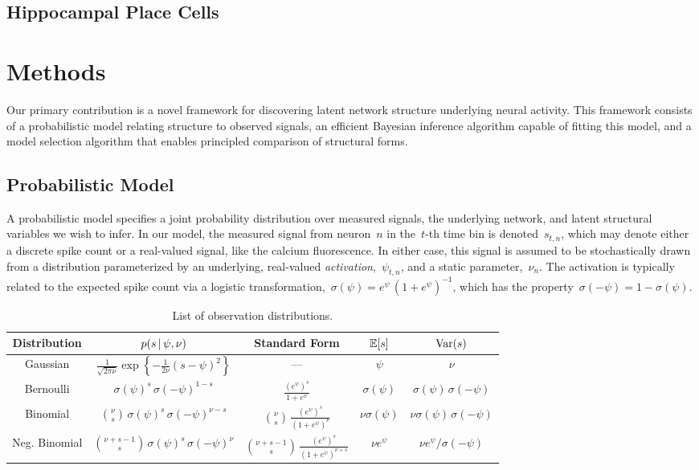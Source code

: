 \subsection{Hippocampal Place Cells}


\section{Methods}
Our primary contribution is a novel framework for discovering latent
network structure underlying neural activity.  This framework consists
of a probabilistic model relating structure to observed signals, an
efficient Bayesian inference algorithm capable of fitting this model,
and a model selection algorithm that enables principled comparison of
structural forms.

\subsection{Probabilistic Model}
A probabilistic model specifies a joint probability distribution over
measured signals, the underlying network, and latent structural
variables we wish to infer.  In our model, the measured signal from
neuron~$n$ in the~$t$-th time bin is denoted~$s_{t,n}$, which may 
denote either a discrete spike count or a real-valued signal, like 
the calcium fluorescence. In either case, this signal is assumed 
to be stochastically drawn from a distribution parameterized by 
an underlying, real-valued \emph{activation},~$\psi_{t,n}$,
and a static parameter,~$\nu_n$. The
activation is typically related to the expected spike count via
a logistic transformation,~$\sigma(\psi) = e^\psi \, (1+e^\psi)^{-1}$,
which has the property~$\sigma(-\psi) = 1-\sigma(\psi)$.

\begin{table}
\begin{center}
\begin{tabular}{c|c|c|c|c}
  \textbf{Distribution} & $p(s \,|\, \psi, \nu)$ & Standard Form & $\mathbb{E}[s]$ & $\mathrm{Var}(s)$ \\
  \hline
  Gaussian & $\frac{1}{\sqrt{2 \pi \nu}}\exp \left \{ -\frac{1}{2 \nu} (s - \psi)^2 \right \}$
  & --- 
  & $\psi$ & $\nu$ \\
  Bernoulli & $\sigma(\psi)^s \, \sigma(-\psi)^{1-s}$
  & $\frac{(e^\psi)^s}{1+e^\psi}$
  & $\sigma(\psi)$ & $\sigma(\psi) \, \sigma(-\psi)$ \\
  Binomial & ${\nu \choose s} \, \sigma(\psi)^s \, \sigma(-\psi)^{\nu-s}$
  & ${\nu \choose s} \,\frac{(e^\psi)^s}{(1+e^\psi)^\nu}$
  & $\nu \sigma(\psi)$ & $\nu \sigma(\psi) \, \sigma(-\psi)$ \\
  Neg. Binomial & ${\nu + s -1 \choose s} \, \sigma(\psi)^s \, \sigma(-\psi)^{\nu}$
  & ${\nu +s - 1 \choose s} \,\frac{(e^\psi)^s}{(1+e^\psi)^{\nu+s}}$
  & $\nu e^\psi$ & $\nu e^\psi / \sigma(-\psi)$ \\
\end{tabular}
\end{center}
\caption{List of observation distributions.}
\label{tab:obs_models}
\end{table}

